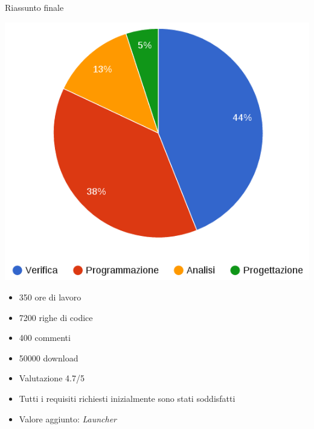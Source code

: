 	\subsection{}
		\begin{frame}{Riassunto finale}
			\begin{minipage}{0.49\textwidth}
				\includegraphics[width=1.0\textwidth]{capitolo_4/immagini/riassunto_ore.png}
			\end{minipage}
			\begin{minipage}{0.49\textwidth}
				\begin{itemize}
					\item 350 ore di lavoro
					\item 7200 righe di codice
					\item 400 commenti
					\item 50000 download
					\item Valutazione 4.7/5
				\end{itemize}
			\end{minipage}\par
			\vspace{3mm}
			\begin{itemize}
				\item Tutti i requisiti richiesti inizialmente sono stati soddisfatti
				\item Valore aggiunto: \alert{\emph{Launcher}}
			\end{itemize}
		\end{frame}
